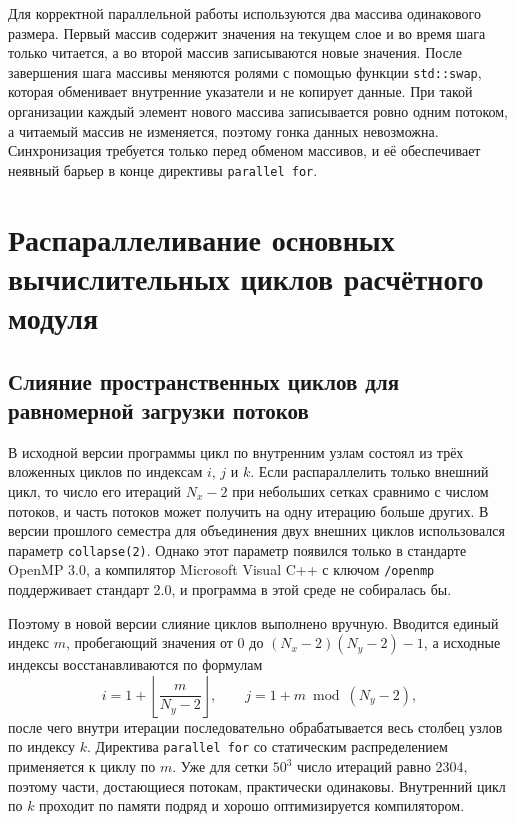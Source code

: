 Для корректной параллельной работы используются два массива одинакового размера. Первый массив содержит значения на текущем слое и во время шага только читается, а во второй массив записываются новые значения. После завершения шага массивы меняются ролями с помощью функции \texttt{std::swap}, которая обменивает внутренние указатели и не копирует данные. При такой организации каждый элемент нового массива записывается ровно одним потоком, а читаемый массив не изменяется, поэтому гонка данных невозможна. Синхронизация требуется только перед обменом массивов, и её обеспечивает неявный барьер в конце директивы \texttt{parallel for}.

\section{Распараллеливание основных вычислительных циклов расчётного модуля}

\subsection{Слияние пространственных циклов для равномерной загрузки потоков}

В исходной версии программы цикл по внутренним узлам состоял из трёх вложенных циклов по индексам $i$, $j$ и $k$. Если распараллелить только внешний цикл, то число его итераций $N_x - 2$ при небольших сетках сравнимо с числом потоков, и часть потоков может получить на одну итерацию больше других. В версии прошлого семестра для объединения двух внешних циклов использовался параметр \texttt{collapse(2)}. Однако этот параметр появился только в стандарте OpenMP 3.0, а компилятор Microsoft Visual C++ с ключом \texttt{/openmp} поддерживает стандарт 2.0, и программа в этой среде не собиралась бы.

Поэтому в новой версии слияние циклов выполнено вручную. Вводится единый индекс $m$, пробегающий значения от 0 до $(N_x - 2)(N_y - 2) - 1$, а исходные индексы восстанавливаются по формулам
\begin{equation}
    i = 1 + \left\lfloor \frac{m}{N_y - 2} \right\rfloor, \qquad j = 1 + m \bmod (N_y - 2),
\end{equation}
после чего внутри итерации последовательно обрабатывается весь столбец узлов по индексу $k$. Директива \texttt{parallel for} со статическим распределением применяется к циклу по $m$. Уже для сетки $50^3$ число итераций равно 2304, поэтому части, достающиеся потокам, практически одинаковы. Внутренний цикл по $k$ проходит по памяти подряд и хорошо оптимизируется компилятором.


